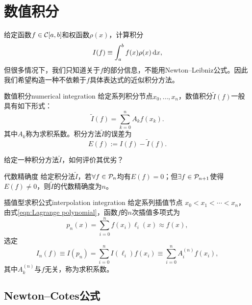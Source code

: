\chapter{数值积分}
\label{chap:numerical integration}

给定函数$f \in \mathcal{C}[a,b]$和权函数$\rho(x)$，计算积分
\begin{equation}
    I(f) \equiv \int_a^bf(x)\rho(x)\mathop{}\!\mathrm{d} x,
\end{equation}
但很多情况下，我们只知道关于$f$的部分信息，不能用Newton--Leibniz公式。因此我们希望构造一种不依赖于$f$具体表达式的近似积分方法。

\begin{definition}
    {数值积分}{numerical integration}
    给定系列积分节点$x_0,\ldots,x_n$，数值积分$\tilde I(f)$一般具有如下形式：
    \begin{equation}
        \tilde I(f) = \sum_{k=0}^nA_kf(x_k).
    \end{equation}
    其中$A_k$称为求积系数。积分方法$\tilde I$的误差为
    \begin{equation}
        E(f) := I(f) - \tilde I(f).
    \end{equation}
\end{definition}

给定一种积分方法$\tilde I$，如何评价其优劣？

\begin{definition}
    {代数精确度}{}
    给定积分法$\tilde I$，若$\forall f \in \mathcal{P}_n$均有$E(f) = 0$；但$\exists f \in \mathcal{P}_{n+1}$使得$E(f) \neq 0$，则$\tilde I$的代数精确度为$n$。
\end{definition}

\begin{definition}
    {插值型求积公式}{interpolation integration}
    给定系列插值节点%
    $x_0 < x_1 < \cdots < x_n$，
    由式\eqref{eqn:Lagrange polynomial}，函数$f$的$n$次插值多项式为
    \[
        p_n(x) = \sum_{i=0}^nf(x_i)\ell_i(x) \approx f(x),
    \]
    选定
    \begin{equation}
        I_n(f) \equiv I(p_n) = \sum_{i=0}^nI(\ell_i)f(x_i) \equiv \sum_{i=0}^nA_i^{(n)}f(x_i),
    \end{equation}
    其中$A_k^{(n)}$与$f$无关，称为求积系数。
\end{definition}

\section{Newton--Cotes公式}
\label{sec:Newton-Cotes formula}

